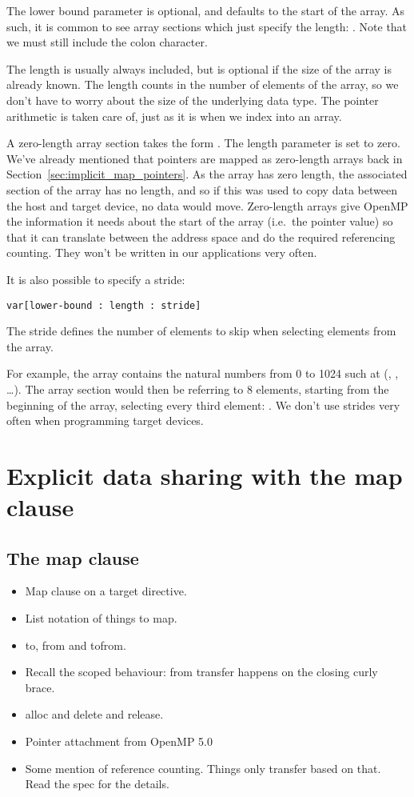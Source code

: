 The lower bound parameter is optional, and defaults to the start of the array. As such, it is common to see array sections which just specify the length: . Note that we must still include the colon character.

The length is usually always included, but is optional if the size of the array is already known.
The length counts in the number of elements of the array, so we don't have to worry about the size of the underlying data type. The pointer arithmetic is taken care of, just as it is when we index into an array.

A zero-length array section takes the form . The length parameter is set to zero. We've already mentioned that pointers are mapped as zero-length arrays back in Section~\ref{sec:implicit_map_pointers}. As the array has zero length, the associated section of the array has no length, and so if this was used to copy data between the host and target device, no data would move. Zero-length arrays give OpenMP the information it needs about the start of the array (i.e.\ the pointer value) so that it can translate between the address space and do the required referencing counting. They won't be written in our applications very often.

It is also possible to specify a stride:
\begin{verbatim}
var[lower-bound : length : stride]
\end{verbatim}
The stride defines the number of elements to skip when selecting elements from the array.

For example, the array  contains the natural numbers from 0 to 1024 such at  (, , \dots).
The array section  would then be referring to 8 elements, starting from the beginning of the array, selecting every third element: .
We don't use strides very often when programming target devices.


\section{Explicit data sharing with the map clause}

\subsection{The map clause}
\label{ssec:map_clause}
\begin{itemize}
  \item Map clause on a target directive.
  \item List notation of things to map.
  \item to, from and tofrom.
  \item Recall the scoped behaviour: from transfer happens on the closing curly brace.
  \item alloc and delete and release.
  \item Pointer attachment from OpenMP 5.0
  \item Some mention of reference counting. Things only transfer based on that. Read the spec for the details.
\end{itemize}

